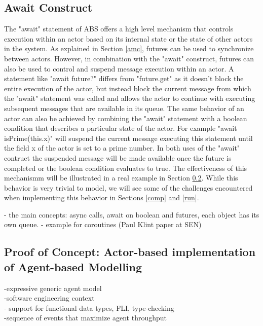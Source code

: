 \subsection{Await Construct}
The "await" statement of ABS offers a high level mechanism that controls execution within an actor based on its internal state or the state of other actors in the system. As explained in Section \ref{amc}, futures can be used to synchronize between actors. However, in combination with the "await" construct, futures can also be used to control and suspend message execution within an actor. A statement like "await future?" differs from "future.get" as it doesn't block the entire execution of the actor, but instead block the current message from which the "await" statement was called and allows the actor to continue with executing subsequent messages that are available in its queue. The same behavior of an actor can also be achieved by combining the "await" statement with a boolean condition that describes a particular state of the actor. For example "await isPrime(this.x)" will suspend the current message executing this statement until the field x of the actor is set to a prime number. In both uses of the "await" contruct the suspended message will be made available once the future is completed or the boolean condition evaluates to true. The effectiveness of this mechanismm will be illustrated in a real example in Section \ref{ag}. While this behavior is very trivial to model, we will see some of the challenges encountered when implementing this behavior in Sections \ref{comp} and \ref{run}.        

- the main concepts: async calls, await on boolean and futures, each object has its own queue.
- example for coroutines (Paul Klint paper at SEN)

\subsection{Proof of Concept: Actor-based implementation of Agent-based Modelling}
\label{ag}
-expressive generic agent model \\
-software engineering context \\
- support for functional data types, FLI, type-checking\\
-sequence of events that maximize agent throughput\\